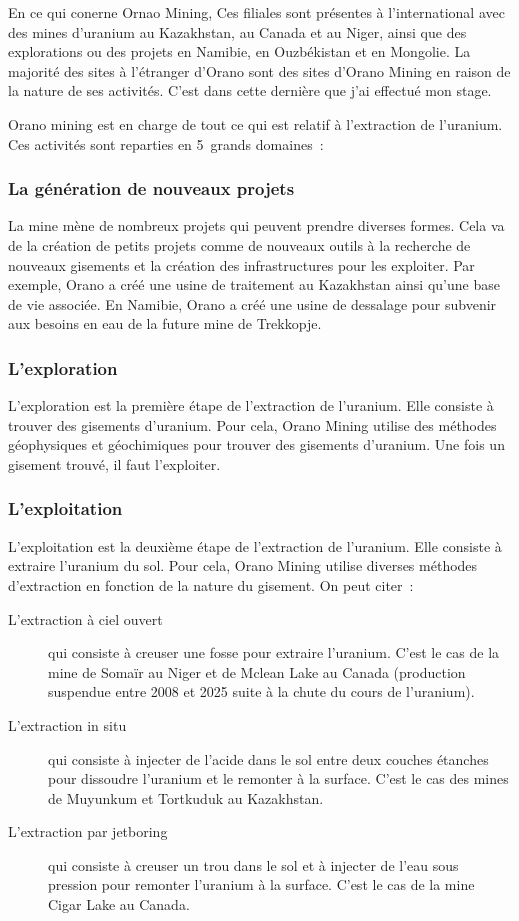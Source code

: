 En ce qui conerne Ornao Mining, Ces filiales sont présentes à l'international avec des mines d'uranium au Kazakhstan, au Canada et au Niger, ainsi que des explorations ou des projets en Namibie, en Ouzbékistan et en Mongolie. La majorité des sites à l'étranger d'Orano sont des sites d'Orano Mining en raison de la nature de ses activités. C'est dans cette dernière que j'ai effectué mon stage.

Orano mining est en charge de tout ce qui est relatif à l'extraction de l'uranium. Ces activités sont reparties en 5~grands domaines~:%

\subsubsection{La génération de nouveaux projets}
La mine mène de nombreux projets qui peuvent prendre diverses formes. Cela va de la création de petits projets comme de nouveaux outils à la recherche de nouveaux gisements et la création des infrastructures pour les exploiter. Par exemple, Orano a créé une usine de traitement au Kazakhstan ainsi qu'une base de vie associée. En Namibie, Orano a créé une usine de dessalage pour subvenir aux besoins en eau de la future mine de Trekkopje.

\subsubsection{L'exploration}
L'exploration est la première étape de l'extraction de l'uranium. Elle consiste à trouver des gisements d'uranium. Pour cela, Orano Mining utilise des méthodes géophysiques et géochimiques pour trouver des gisements d'uranium. Une fois un gisement trouvé, il faut l'exploiter.

\subsubsection{L'exploitation}
L'exploitation est la deuxième étape de l'extraction de l'uranium. Elle consiste à extraire l'uranium du sol. Pour cela, Orano Mining utilise diverses méthodes d'extraction en fonction de la nature du gisement. On peut citer~:
\begin{description}

    \item [L'extraction à ciel ouvert]qui consiste à creuser une fosse pour extraire l'uranium. C'est le cas de la mine de Somaïr au Niger et de Mclean Lake au Canada (production suspendue entre 2008 et 2025 suite à la chute du cours de l'uranium).
    \item [L'extraction in situ] qui consiste à injecter de l'acide dans le sol entre deux couches étanches pour dissoudre l'uranium et le remonter à la surface. C'est le cas des mines de Muyunkum et Tortkuduk au Kazakhstan.
    \item [L'extraction par jetboring]qui consiste à creuser un trou dans le sol et à injecter de l'eau sous pression pour remonter l'uranium à la surface. C'est le cas de la mine Cigar Lake au Canada.

\end{description}

